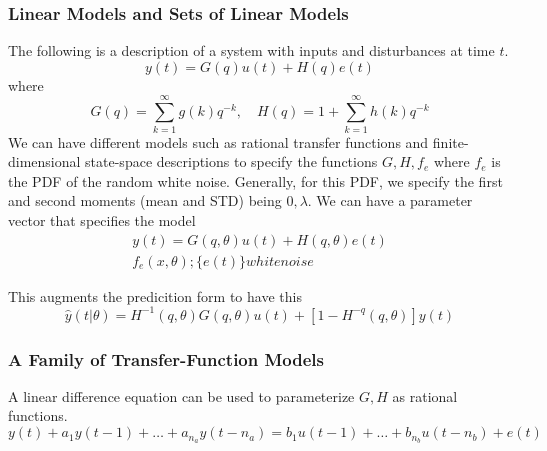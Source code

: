 \subsubsection{Linear Models and Sets of Linear Models}
The following is a description of a system with inputs and disturbances at time $t$.
\begin{equation}
    y(t) = G(q) u(t) + H(q) e(t)
\end{equation}
where
\begin{equation}
    G(q) = \sum_{k=1}^{\infty} g(k) q^{-k}, \quad H(q) = 1+ \sum_{k=1}^{\infty} h(k) q^{-k}
\end{equation}
We can have different models such as rational transfer functions and finite-dimensional state-space descriptions to specify the functions $G,H, f_e$ where $f_e$ is the PDF of the random white noise.
Generally, for this PDF, we specify the first and second moments (mean and STD) being $0, \lambda$.
We can have a parameter vector that specifies the model
\begin{gather}
    y(t) = G(q,\theta) u(t) + H(q,\theta) e(t) \\
    f_e(x, \theta); \{e(t)\} white noise
\end{gather}

This augments the predicition form to have this
\begin{equation}
    \hat{y}(t |\theta) = H^{-1}(q,\theta) G(q,\theta) u(t) + [1-H^{-q}(q,\theta)] y(t)
\end{equation}

\subsubsection{A Family of Transfer-Function Models}
A linear difference equation can be used to parameterize $G,H$ as rational functions.
\begin{equation}
    y(t) + a_1 y(t-1) + \dots + a_{n_a} y(t-n_a) = b_1 u(t-1) + \dots + b_{n_b} u(t-n_b) + e(t)
\end{equation}

